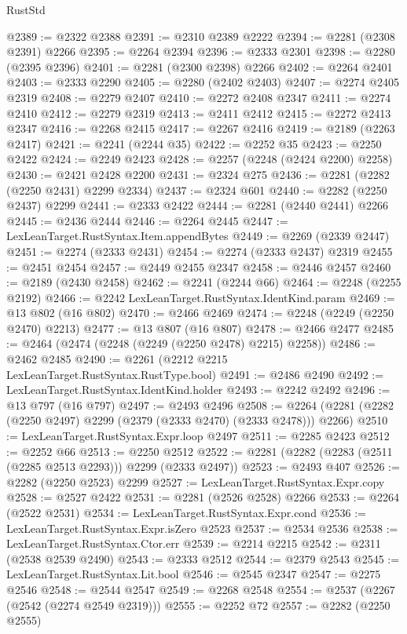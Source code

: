 \begin{lexlean}{RustStd}
\begin{coremodule}
{\begin{coremodule}
{{{{{{{{{{{{{{@2389 := @2322 @2388
@2391 := @2310 @2389 @2222
@2394 := @2281 (@2308 @2391) @2266
@2395 := @2264 @2394
@2396 := @2333 @2301
@2398 := @2280 (@2395 @2396)
@2401 := @2281 (@2300 @2398) @2266
@2402 := @2264 @2401
@2403 := @2333 @2290
@2405 := @2280 (@2402 @2403)
@2407 := @2274 @2405 @2319
@2408 := @2279 @2407
@2410 := @2272 @2408 @2347
@2411 := @2274 @2410
@2412 := @2279 @2319
@2413 := @2411 @2412
@2415 := @2272 @2413 @2347
@2416 := @2268 @2415
@2417 := @2267 @2416
@2419 := @2189 (@2263 @2417)
@2421 := @2241 (@2244 @35)
@2422 := @2252 @35
@2423 := @2250 @2422
@2424 := @2249 @2423
@2428 := @2257 (@2248 (@2424 @2200) @2258)
@2430 := @2421 @2428 @2200
@2431 := @2324 @275
@2436 := @2281 (@2282 (@2250 @2431) @2299 @2334)
@2437 := @2324 @601
@2440 := @2282 (@2250 @2437) @2299
@2441 := @2333 @2422
@2444 := @2281 (@2440 @2441) @2266
@2445 := @2436 @2444
@2446 := @2264 @2445
@2447 := LexLeanTarget.RustSyntax.Item.appendBytes
@2449 := @2269 (@2339 @2447)
@2451 := @2274 (@2333 @2431)
@2454 := @2274 (@2333 @2437) @2319
@2455 := @2451 @2454
@2457 := @2449 @2455 @2347
@2458 := @2446 @2457
@2460 := @2189 (@2430 @2458)
@2462 := @2241 (@2244 @66)
@2464 := @2248 (@2255 @2192)
@2466 := @2242 LexLeanTarget.RustSyntax.IdentKind.param
@2469 := @13 @802 (@16 @802)
@2470 := @2466 @2469
@2474 := @2248 (@2249 (@2250 @2470) @2213)
@2477 := @13 @807 (@16 @807)
@2478 := @2466 @2477
@2485 := @2464 (@2474 (@2248 (@2249 (@2250 @2478) @2215) @2258))
@2486 := @2462 @2485
@2490 := @2261 (@2212 @2215 LexLeanTarget.RustSyntax.RustType.bool)
@2491 := @2486 @2490
@2492 := LexLeanTarget.RustSyntax.IdentKind.holder
@2493 := @2242 @2492
@2496 := @13 @797 (@16 @797)
@2497 := @2493 @2496
@2508 := @2264 (@2281 (@2282 (@2250 @2497) @2299 (@2379 (@2333 @2470) (@2333 @2478))) @2266)
@2510 := LexLeanTarget.RustSyntax.Expr.loop @2497
@2511 := @2285 @2423
@2512 := @2252 @66
@2513 := @2250 @2512
@2522 := @2281 (@2282 (@2283 (@2511 (@2285 @2513 @2293))) @2299 (@2333 @2497))
@2523 := @2493 @407
@2526 := @2282 (@2250 @2523) @2299
@2527 := LexLeanTarget.RustSyntax.Expr.copy
@2528 := @2527 @2422
@2531 := @2281 (@2526 @2528) @2266
@2533 := @2264 (@2522 @2531)
@2534 := LexLeanTarget.RustSyntax.Expr.cond
@2536 := LexLeanTarget.RustSyntax.Expr.isZero @2523
@2537 := @2534 @2536
@2538 := LexLeanTarget.RustSyntax.Ctor.err
@2539 := @2214 @2215
@2542 := @2311 (@2538 @2539 @2490)
@2543 := @2333 @2512
@2544 := @2379 @2543
@2545 := LexLeanTarget.RustSyntax.Lit.bool
@2546 := @2545 @2347
@2547 := @2275 @2546
@2548 := @2544 @2547
@2549 := @2268 @2548
@2554 := @2537 (@2267 (@2542 (@2274 @2549 @2319)))
@2555 := @2252 @72
@2557 := @2282 (@2250 @2555)
}}}}}}}}}}}}}}
\end{coremodule}}
\end{coremodule}
\end{lexlean}
